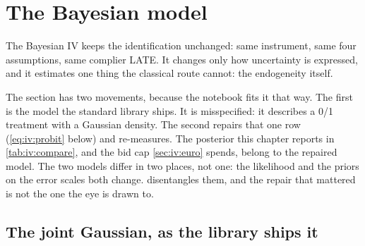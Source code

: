\section{The Bayesian model}
\label{sec:iv:bayes}

The Bayesian IV keeps the identification unchanged: same instrument, same four assumptions, same
complier LATE. It changes only how uncertainty is expressed, and it estimates one thing the
classical route cannot: the endogeneity itself.

The section has two movements, because the notebook fits it that way. The first is the model the
standard library ships. It is misspecified: it describes a 0/1 treatment with a Gaussian density.
The second repairs that one row (\cref{eq:iv:probit} below) and re-measures. The posterior
this chapter reports in \cref{tab:iv:compare}, and the bid cap \cref{sec:iv:euro} spends, belong to
the repaired model. The two models differ in two places, not one: the likelihood and the priors on
the error scales both change.  disentangles them, and the repair that mattered is
not the one the eye is drawn to.

\subsection*{The joint Gaussian, as the library ships it}

